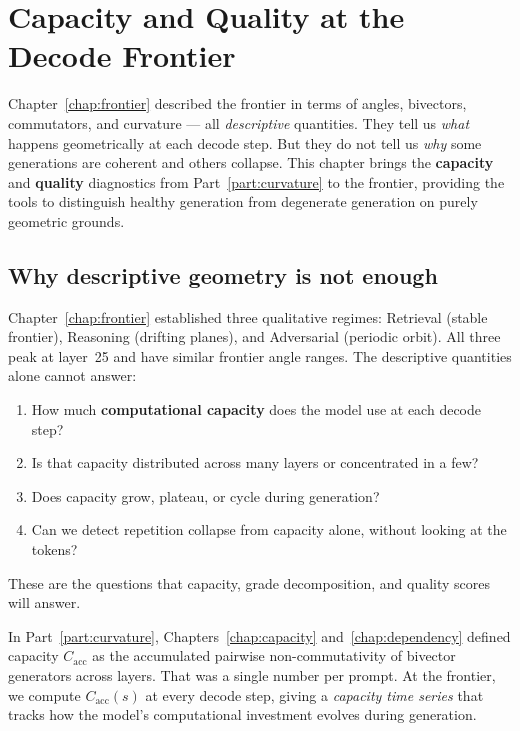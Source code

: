 \documentclass[11pt, twoside, openright]{memoir}
\numberwithin{equation}{chapter}
\begin{document}
\chapter{Capacity and Quality at the Decode Frontier}
\label{chap:frontier-capacity}

\begin{whycare}
Chapter~\ref{chap:frontier} described the frontier in terms of
angles, bivectors, commutators, and curvature --- all
\emph{descriptive} quantities.  They tell us \emph{what} happens
geometrically at each decode step.
But they do not tell us \emph{why} some generations are coherent
and others collapse.
This chapter brings the \textbf{capacity} and \textbf{quality}
diagnostics from Part~\ref{part:curvature} to the frontier,
providing the tools to distinguish healthy generation from
degenerate generation on purely geometric grounds.
\end{whycare}


\section{Why descriptive geometry is not enough}
\label{sec:cap-motivation}

Chapter~\ref{chap:frontier} established three qualitative
regimes: Retrieval (stable frontier), Reasoning (drifting planes),
and Adversarial (periodic orbit).  All three peak at layer~25
and have similar frontier angle ranges.  The descriptive quantities
alone cannot answer:

\begin{enumerate}[nosep]
\item How much \textbf{computational capacity} does the model use
  at each decode step?
\item Is that capacity distributed across many layers or
  concentrated in a few?
\item Does capacity grow, plateau, or cycle during generation?
\item Can we detect repetition collapse from capacity alone,
  without looking at the tokens?
\end{enumerate}

These are the questions that capacity, grade decomposition, and
quality scores will answer.

\begin{transformer}
In Part~\ref{part:curvature}, Chapters~\ref{chap:capacity}
and~\ref{chap:dependency} defined capacity $C_{\mathrm{acc}}$ as
the accumulated pairwise non-commutativity of bivector generators
across layers.  That was a single number per prompt.  At the
frontier, we compute $C_{\mathrm{acc}}(s)$ at every decode step,
giving a \emph{capacity time series} that tracks how the model's
computational investment evolves during generation.
\end{transformer}
\end{document}
